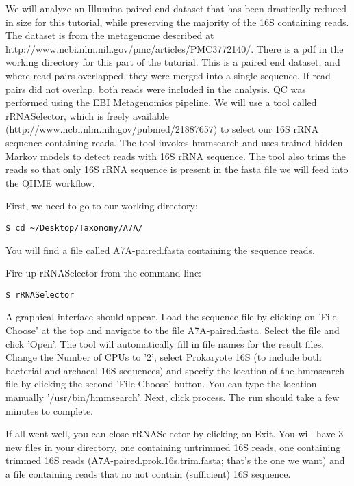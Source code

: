\documentclass[a4paper,12pt,twoside]{memoir}
\begin{document}
\begin{note}
We will analyze an Illumina paired-end dataset that has been drastically reduced in size for this tutorial, while preserving the majority of the 16S containing reads. The dataset is from the metagenome described at http://www.ncbi.nlm.nih.gov/pmc/articles/PMC3772140/. There is a pdf in the working directory for this part of the tutorial. This is a paired end dataset, and where read pairs overlapped, they were merged into a single sequence. If read pairs did not overlap, both reads were included in the analysis. QC was performed using the EBI Metagenomics pipeline.
We will use a tool called rRNASelector, which is freely available (http://www.ncbi.nlm.nih.gov/pubmed/21887657) to select our 16S rRNA sequence containing reads. 
The tool invokes hmmsearch and uses trained hidden Markov models to detect reads with 16S rRNA sequence. The tool also trims the reads so that only 16S rRNA sequence is present in the fasta file we will feed into the QIIME workflow.
\end{note}

\begin{steps}
First, we need to go to our working directory: 
\begin{lstlisting}
$ cd ~/Desktop/Taxonomy/A7A/
\end{lstlisting}
\end{steps}

\begin{note}
You will find a file called A7A-paired.fasta containing the sequence reads.

Fire up rRNASelector from the command line:
\end{note}

\begin{steps}
\begin{lstlisting}
$ rRNASelector
\end{lstlisting}
\end{steps}

\begin{note}
A graphical interface should appear. Load the sequence file by clicking on 'File Choose' at the top and navigate to the file A7A-paired.fasta. Select the file and click 'Open'. The tool will automatically fill in file names for the result files. Change the Number of CPUs to '2', select Prokaryote 16S (to include both bacterial and archaeal 16S sequences) and specify the location of the hmmsearch file by clicking the second 'File Choose' button. You can type the location manually '/usr/bin/hmmsearch'. Next, click process. The run should take a few minutes to complete.

If all went well, you can close rRNASelector by clicking on Exit. You will have 3 new files in your directory, one containing untrimmed 16S reads, one containing trimmed 16S reads (A7A-paired.prok.16s.trim.fasta; that’s the one we want) and a file containing reads that no not contain (sufficient) 16S sequence.
\end{note}
\end{document}
